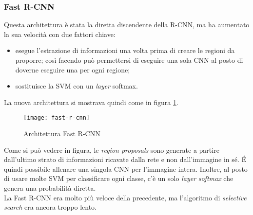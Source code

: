\subsubsection*{Fast R-CNN}
Questa architettura è stata la diretta discendente della R-CNN, ma ha aumentato la sua velocità con due fattori chiave:
\begin{itemize}
	\item esegue l'estrazione di informazioni una volta prima di creare le regioni da proporre; così facendo può permettersi di eseguire una sola CNN al posto di doverne eseguire una per ogni regione;
	\item sostituisce la SVM con un \textit{layer} \gls{softmax}.
\end{itemize}
La nuova architettura si mostrava quindi come in figura \ref{img:fast-r-cnn_architecture}.
\begin{figure}[!ht] 
	\centering
	\texttt{[image: fast-r-cnn]} 
	\caption{Architettura Fast R-CNN}
	\label{img:fast-r-cnn_architecture}
\end{figure}
Come si può vedere in figura, le \textit{region proposals} sono generate a partire dall'ultimo strato di informazioni ricavate dalla rete e non dall'immagine in sé. \'E quindi possibile allenare una singola CNN per l'immagine intera. Inoltre, al posto di usare molte SVM per classificare ogni classe, c'è un solo \textit{layer} \textit{softmax} che genera una probabilità diretta.
\medskip
\\La Fast R-CNN era molto più veloce della precedente, ma l'algoritmo di \textit{selective search} era ancora troppo lento.

